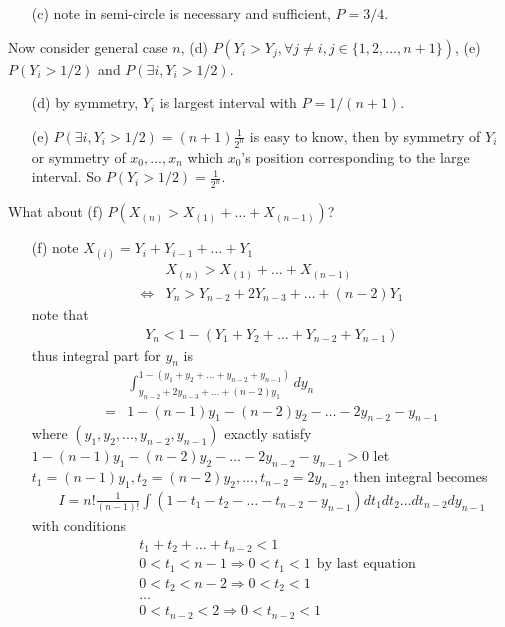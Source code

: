 \documentclass[paper=a4, fontsize=11pt]{scrartcl} %
\numberwithin{equation}{section} %
\numberwithin{figure}{section} %
\numberwithin{table}{section} %
\begin{document}
\begin{itemize}
\begin{itemize}
		\item[(c)] note in semi-circle is necessary and sufficient, $P=3/4$.
	\end{itemize}
	Now consider general case $n$, (d) $P(Y_i>Y_j,\forall j\neq i, j\in\{1,2,...,n+1\})$, (e) $P(Y_i>1/2)$ and $P(\exists i, Y_i>1/2)$.
	\begin{itemize}
		\item[(d)] by symmetry, $Y_i$ is largest interval with $P=1/(n+1)$.
		\item[(e)] $P(\exists i, Y_i>1/2)= (n+1)\frac{1}{2^n}$ is easy to know, then by symmetry of $Y_i$ or symmetry of $x_0,...,x_n$ which $x_0$'s position corresponding to the large interval. So $P(Y_i>1/2) = \frac{1}{2^n}$.
	\end{itemize}
	What about (f) $P(X_{(n)} > X_{(1)} + \dots + X_{(n-1)})$?
	\begin{itemize}
		\item[(f)] note $X_{(i)} = Y_i+Y_{i-1}+\dots+Y_1$
		\begin{align}
			&X_{(n)} > X_{(1)} + \dots + X_{(n-1)} \\
			\Leftrightarrow & Y_n > Y_{n-2}+ 2Y_{n-3}+ \dots+ (n-2)Y_1 
		\end{align}
		note that
		\begin{align}
			Y_n < 1 - (Y_1 + Y_2 +\dots + Y_{n-2} +Y_{n-1}) 
		\end{align}
		thus integral part for $y_n$ is
		\begin{align}
			&\int_{y_{n-2}+ 2y_{n-3}+ \dots+ (n-2)y_1}^{1 - (y_1 + y_2 +\dots + y_{n-2} +y_{n-1})} dy_n \\
			=& 1 - (n-1)y_1 -(n-2)y_2 -\dots- 2 y_{n-2} -y_{n-1}
		\end{align}
		where $(y_1,y_2,...,y_{n-2},y_{n-1})$ exactly satisfy $1 - (n-1)y_1 -(n-2)y_2 -\dots- 2 y_{n-2}-y_{n-1}>0$
		let $t_1= (n-1)y_1, t_2 = (n-2)y_2,...,t_{n-2} = 2 y_{n-2}$, then integral becomes
		\begin{align}
			I = n! \frac{1}{(n-1)!} \int (1-t_1-t_2-\dots-t_{n-2}-y_{n-1}) dt_1dt_2\dots dt_{n-2}dy_{n-1}
		\end{align}
		with conditions
		\begin{align}
			& t_1 + t_2 + \dots + t_{n-2} <1 \\
			& 0<t_1 <n-1 \Rightarrow 0<t_1<1 \ \ \text{by last equation}\\
			& 0<t_2 <n-2 \Rightarrow 0<t_2<1\\
			&\dots\\
			& 0<t_{n-2}<2 \Rightarrow 0<t_{n-2}<1 \\

\end{align}
\end{itemize}
\end{itemize}
\end{document}
